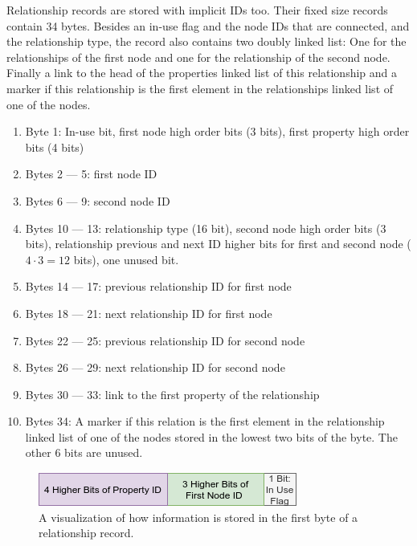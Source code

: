 \documentclass[a4paper,10pt]{article}
\begin{document}
            
            Relationship records are stored with implicit IDs too. 
            Their fixed size records contain 34 bytes.
            Besides an in-use flag and the node IDs that are connected, and the relationship type, the record also contains two doubly linked list: One for the relationships of the first node and one for the relationship of the second node.
            Finally a link to the head of the properties linked list of this relationship and a marker if this relationship is the first element in the relationships linked list of one of the nodes.
            \newpage
            
            \begin{enumerate}
                \item Byte 1: In-use bit, first node high order bits (3 bits), first property high order bits (4 bits)
                \item Bytes 2 --- 5: first node ID 
                \item Bytes 6 --- 9: second node ID 
                \item Bytes 10 --- 13: relationship type (16 bit), second node high order bits (3 bits), relationship previous and next ID higher bits for first and second node ($4 \cdot 3 = 12$ bits), one unused bit.
                \item Bytes 14 --- 17: previous relationship ID for first node
                \item Bytes 18 --- 21: next relationship ID for first node
                \item Bytes 22 --- 25: previous relationship ID for second node
                \item Bytes 26 --- 29: next relationship ID for second node
                \item Bytes 30 --- 33: link to the first property of the relationship
                \item Bytes 34: A marker if this relation is the first element in the relationship linked list of one of the nodes stored in the lowest two bits of the byte. 
                    The other 6 bits are unused.
            \end{enumerate}


            \begin{figure}[htp]\label{rel_first_byte}
                \begin{center}
                    \includegraphics[keepaspectratio,width=\textwidth]{img/03_record/relationship/relationship_first_byte.png}
                \end{center}
                \caption{A visualization of how information is stored in the first byte of a relationship record.} 
            \end{figure}
\end{document}
